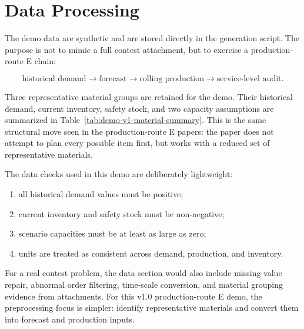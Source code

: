 \section{Data Processing}

The demo data are synthetic and are stored directly in the generation script. The purpose is not to mimic a full contest attachment, but to exercise a production-route E chain:

\begin{equation}
\text{historical demand} \rightarrow \text{forecast} \rightarrow \text{rolling production} \rightarrow \text{service-level audit}.
\end{equation}

Three representative material groups are retained for the demo. Their historical demand, current inventory, safety stock, and two capacity assumptions are summarized in Table~\ref{tab:demo-v1-material-summary}. This is the same structural move seen in the production-route E papers: the paper does not attempt to plan every possible item first, but works with a reduced set of representative materials.



The data checks used in this demo are deliberately lightweight:

\begin{enumerate}
\item all historical demand values must be positive;
\item current inventory and safety stock must be non-negative;
\item scenario capacities must be at least as large as zero;
\item units are treated as consistent across demand, production, and inventory.
\end{enumerate}

For a real contest problem, the data section would also include missing-value repair, abnormal order filtering, time-scale conversion, and material grouping evidence from attachments. For this v1.0 production-route E demo, the preprocessing focus is simpler: identify representative materials and convert them into forecast and production inputs.
